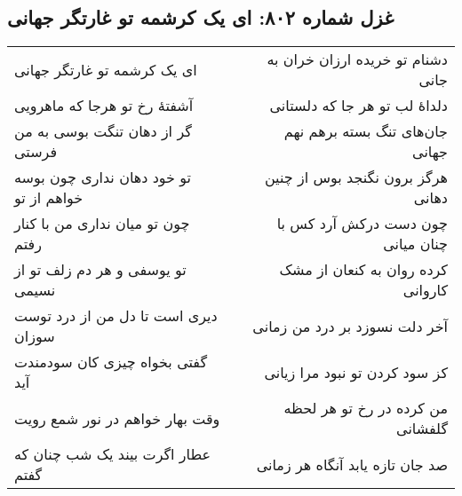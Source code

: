 \begin{center}
\section*{غزل شماره ۸۰۲: ای یک کرشمه تو غارتگر جهانی}
\label{sec:802}
\begin{longtable}{l p{0.5cm} r}
ای یک کرشمه تو غارتگر جهانی
&&
دشنام تو خریده ارزان خران به جانی
\\
آشفتهٔ رخ تو هرجا که ماهرویی
&&
دلداهٔ لب تو هر جا که دلستانی
\\
گر از دهان تنگت بوسی به من فرستی
&&
جان‌های تنگ بسته برهم نهم جهانی
\\
تو خود دهان نداری چون بوسه خواهم از تو
&&
هرگز برون نگنجد بوس از چنین دهانی
\\
چون تو میان نداری من با کنار رفتم
&&
چون دست درکش آرد کس با چنان میانی
\\
تو یوسفی و هر دم زلف تو از نسیمی
&&
کرده روان به کنعان از مشک کاروانی
\\
دیری است تا دل من از درد توست سوزان
&&
آخر دلت نسوزد بر درد من زمانی
\\
گفتی بخواه چیزی کان سودمندت آید
&&
کز سود کردن تو نبود مرا زیانی
\\
وقت بهار خواهم در نور شمع رویت
&&
من کرده در رخ تو هر لحظه گلفشانی
\\
عطار اگرت بیند یک شب چنان که گفتم
&&
صد جان تازه یابد آنگاه هر زمانی
\\
\end{longtable}
\end{center}
